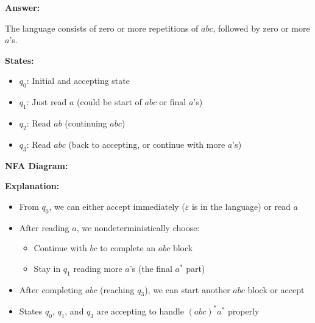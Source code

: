 \documentclass[12pt]{article}
\begin{document}
\textbf{Answer:}

The language consists of zero or more repetitions of $abc$, followed by zero or more $a$'s.

\textbf{States:}
\begin{itemize}
    \item $q_0$: Initial and accepting state
    \item $q_1$: Just read $a$ (could be start of $abc$ or final $a$'s)
    \item $q_2$: Read $ab$ (continuing $abc$)
    \item $q_3$: Read $abc$ (back to accepting, or continue with more $a$'s)
\end{itemize}

\textbf{NFA Diagram:}

\begin{center}
\end{center}

\textbf{Explanation:}
\begin{itemize}
    \item From $q_0$, we can either accept immediately ($\varepsilon$ is in the language) or read $a$
    \item After reading $a$, we nondeterministically choose:
    \begin{itemize}
        \item Continue with $bc$ to complete an $abc$ block
        \item Stay in $q_1$ reading more $a$'s (the final $a^*$ part)
    \end{itemize}
    \item After completing $abc$ (reaching $q_3$), we can start another $abc$ block or accept
    \item States $q_0$, $q_1$, and $q_3$ are accepting to handle $(abc)^*a^*$ properly
\end{itemize}
\end{document}

